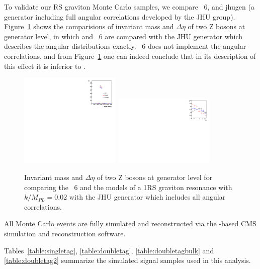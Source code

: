 To validate our RS graviton Monte Carlo samples, we compare \PYTHIA~6, \HERWIG{++} and 
{\sc jhugen} (a generator including full angular correlations developed by the JHU group). 
Figure~\ref{fig:compare-Herwig++-Pythia6} shows the comparisions of invariant mass and
$\Delta\eta$ of two Z bosons at generator level, in which \HERWIG{++} and
\PYTHIA~6 are compared with the JHU generator which describes the
angular distributions exactly.  \PYTHIA~6 does not implement the angular
correlations, and from Figure~\ref{fig:compare-Herwig++-Pythia6} one can indeed conclude
that in its description of this effect it is inferior to \HERWIG{++}.

\begin{figure}[htb]
\begin{center}
\includegraphics[width=0.43\textwidth]{EXO-12-024/figs/comparison-jhu-pythia-herwigg/MX.pdf}
\includegraphics[width=0.43\textwidth]{EXO-12-024/figs/comparison-jhu-pythia-herwigg/delta-y.pdf}
\end{center}
\caption{Invariant mass and $\Delta\eta$ of two Z bosons at generator level for comparing the \PYTHIA~6 and the \HERWIG{++} models of a 1\TeVcc RS graviton resonance with $k/M_{PL}=0.02$ with the JHU generator which includes all angular correlations.}
\label{fig:compare-Herwig++-Pythia6}
\end{figure}

All Monte Carlo events are fully simulated and reconstructed via the \GEANTfour-based CMS simulation
 and reconstruction software.

Tables~\ref{table:singletag}, \ref{table:doubletag}, \ref{table:doubletagbulk} and \ref{table:doubletag2} summarize the simulated signal samples used in this analysis. 




